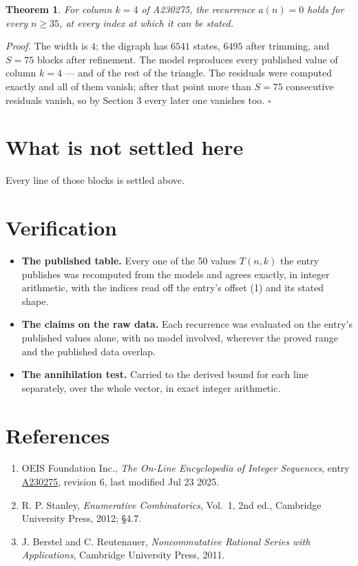 \documentclass[11pt]{article}
\newtheorem{theorem}{Theorem}
\theoremstyle{definition}
\begin{document}
\begin{theorem} For column $k = 4$ of A230275, the recurrence $a(n) = 0$ holds for every $n \ge 35$, at every index at which it can be stated.\end{theorem}

{\itshape Proof.} The width is $4$; the digraph has $6541$ states, $6495$ after trimming, and $S = 75$ blocks after refinement. The model reproduces every published value of column $k = 4$ --- and of the rest of the triangle. The residuals were computed exactly and all of them vanish; after that point more than $S = 75$ consecutive residuals vanish, so by Section 3 every later one vanishes too. $\square$

\section{What is not settled here}

Every line of those blocks is settled above.

\section{Verification}

\begin{itemize}

\item {\bfseries The published table.} Every one of the 50 values $T(n,k)$ the entry publishes was recomputed from the models and agrees exactly, in integer arithmetic, with the indices read off the entry's offset (1) and its stated shape.

\item {\bfseries The claims on the raw data.} Each recurrence was evaluated on the entry's published values alone, with no model involved, wherever the proved range and the published data overlap.

\item {\bfseries The annihilation test.} Carried to the derived bound for each line separately, over the whole vector, in exact integer arithmetic.

\end{itemize}

\section{References}

\begin{enumerate}

\item OEIS Foundation Inc., \emph{The On-Line Encyclopedia of Integer Sequences}, entry \href{https://oeis.org/A230275}{A230275}, revision 6, last modified Jul 23 2025.

\item R. P. Stanley, \emph{Enumerative Combinatorics}, Vol.~1, 2nd ed., Cambridge University Press, 2012; \S4.7.

\item J. Berstel and C. Reutenauer, \emph{Noncommutative Rational Series with Applications}, Cambridge University Press, 2011.

\end{enumerate}
\end{document}
